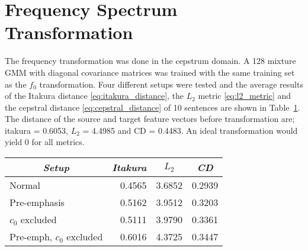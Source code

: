 \section{Frequency Spectrum Transformation} %
\label{sec:frequency_transformation}
The frequency transformation was done in the cepstrum domain. A 128 mixture GMM with diagonal covariance matrices was trained with the same training set as the $f_0$ transformation. Four different setups were tested and the average results of the Itakura distance \eqref{eq:itakura_distance}, the $L_2$ metric \eqref{eq:l2_metric} and the cepstral distance \eqref{eq:cepstral_distance} of 10 sentences are shown in Table~\ref{tab:absolute_freq_results}. The distance of the source and target feature vectors before transformation are; itakura = 0.6053, $L_2$ = 4.4985 and CD = 0.4483. An ideal transformation would yield 0 for all metrics.
\begin{table}[htbp]
	\begin{center}
		\label{tab:absolute_freq_results}
		\begin{tabular}{lrrr}
			\toprule
			\multicolumn{1}{c}{\emph{Setup}} & \multicolumn{1}{c}{\emph{Itakura}} & \multicolumn{1}{c}{\emph{$L_2$}} & \multicolumn{1}{c}{\emph{CD}}\\
			\midrule
			Normal &  0.4565 & 3.6852 & 0.2939 \\
			Pre-emphasis & 0.5162 & 3.9512 & 0.3203 \\
			$c_0$ excluded & 0.5111 & 3.9790 & 0.3361 \\
			Pre-emph, $c_0$ excluded & 0.6016 & 4.3725 & 0.3447 \\
			\bottomrule			
		\end{tabular}		
	\end{center}	
\end{table}



